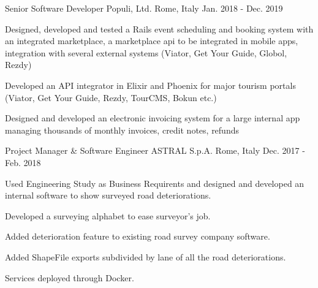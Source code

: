 

\begin{cventries}

  \cventry
    {Senior Software Developer} %
    {Populi, Ltd.} %
    {Rome, Italy} %
    {Jan. 2018 - Dec. 2019} %
    {
      \begin{cvitems} %
        \item {Designed, developed and tested a Rails event scheduling and booking system with an integrated marketplace, a marketplace api to be integrated in mobile apps, integration with several external systems (Viator, Get Your Guide, Globol, Rezdy)}
        \item {Developed an API integrator in Elixir and Phoenix for major tourism portals (Viator, Get Your Guide, Rezdy, TourCMS, Bokun etc.)}
        \item {Designed and developed an electronic invoicing system for a large internal app managing thousands of monthly invoices, credit notes, refunds}
      \end{cvitems}
    }

  \cventry
    {Project Manager \& Software Engineer} %
    {ASTRAL S.p.A.} %
    {Rome, Italy} %
    {Dec. 2017 - Feb. 2018} %
    {
      \begin{cvitems} %
        \item {Used Engineering Study as Business Requirents and designed and developed an internal software to show surveyed road deteriorations.}
        \item {Developed a surveying alphabet to ease surveyor's job.}
        \item {Added deterioration feature to existing road survey company software.}
        \item {Added ShapeFile exports subdivided by lane of all the road deteriorations.}
        \item {Services deployed through Docker.}
      \end{cvitems}
    }


\end{cventries}

